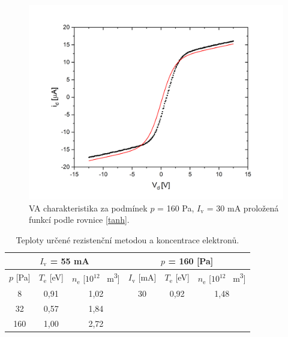 \documentclass[a4paper,12pt]{article}
\begin{document}
\begin{figure}[h!]
	\centering
	\includegraphics[width=130mm]{tanh4.png}
	\caption{VA charakteristika za podmínek $p$ = 160 \si{\pascal}, $I_\text{{v}}$ = 30 \si{\milli\ampere} proložená funkcí podle rovnice \eqref{tanh}.}
	\label{tanh4}
\end{figure}

\newpage
\begin{center}
	\begin{table}[h!]
		\centering
		\caption{Teploty určené rezistenční metodou a koncentrace elektronů.}
		\label{tab1}
		\begin{tabular}{|c|c|c|c|c|c|} \hline
			\multicolumn{3}{|c|}{$I_\text{v}$ = 55 \si{\milli\ampere}}& \multicolumn{3}{c|}{$p$ = 160 [\si{\pascal}] }  \\ \hline
			$p$ [\si{\pascal}] & $T_\text{e}$ [\si{\electronvolt}]  & $n_\text{e}$ [$10^{12}$ \si{\per\meter\cubed}]& $I_\text{v}$ [\si{\milli\ampere}] & $T_\text{e}$ [\si{\electronvolt}] & $n_\text{e}$  [$  10^{12}$ \si{\per\meter\cubed}]\\ \hline
			8 & 0,91 & 1,02 & 30 & 0,92 & 1,48\\ \hline
			32 & 0,57 & 1,84 &  &  &  \\ \hline
			160 & 1,00 & 2,72 &  &  &  \\ \hline
			
		\end{tabular}
	\end{table}
\end{center}
\end{document}
